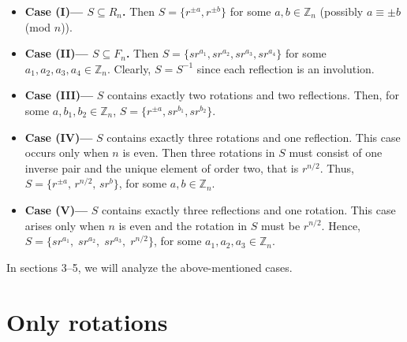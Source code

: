 \documentclass[12pt,reqno,a4paper]{amsart}
\theoremstyle{definition}
\begin{document}
\begin{itemize}
    \item[] \noindent\textbf{Case (I)— $S \subseteq R_{n}$.}  
Then $S = \{r^{\pm a}, r^{\pm b}\}$
for some $a,b \in \mathbb{Z}_n$ (possibly $a \equiv \pm b$ (mod $n$)).
     \item[] \noindent\textbf{Case (II)— $S \subseteq F_{n}$.}  
Then $S=\{sr^{a_1}, sr^{a_2}, sr^{a_3}, sr^{a_4}\}$ for some $a_{1},a_{2},a_{3},a_{4} \in \mathbb{Z}_n$. Clearly, $S=S^{-1}$ since each reflection is an involution. 
      \item[] \noindent\textbf{Case (III)—}  
$S$ contains exactly two rotations and two reflections. Then, for some $a,b_1,b_2\in\mathbb{Z}_n$,
$S=\{r^{\pm a}, sr^{b_1}, sr^{b_2}\}$. 
    \item[] \noindent\textbf{Case (IV)—}  
$S$ contains exactly three rotations and one reflection. This case occurs only when $n$ is even. Then three rotations in $S$ must consist of one inverse pair and the unique element of order two, that is $r^{n/2}$. Thus,
$S = \{r^{\pm a},\, r^{n/2},\, sr^b\}$, for some $a,b\in\mathbb{Z}_n$.
    \item[] \textbf{Case (V)—} 
$S$ contains exactly three reflections and one rotation. This case arises only when $n$ is even and the rotation in $S$ must be $r^{n/2}$. Hence,
$S = \{ s r^{a_1}, \; s r^{a_2}, \; s r^{a_3}, \; r^{n/2} \}$, for some $a_1,a_2,a_3 \in \mathbb{Z}_n$.
\end{itemize}

In sections 3--5, we will analyze the above-mentioned cases.


\section{Only rotations}
\end{document}
